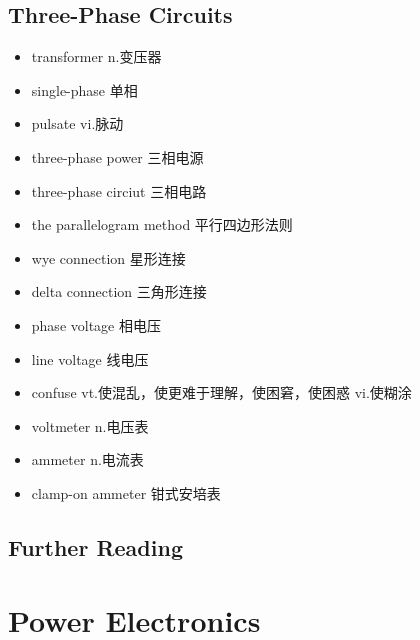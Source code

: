 \subsection{Three-Phase Circuits}
\begin{multicols}{2}
    \begin{itemize}
        \item transformer n.变压器
        \item single-phase 单相
        \item pulsate vi.脉动
        \item three-phase power 三相电源
        \item three-phase circiut 三相电路
        \item the parallelogram method 平行四边形法则
        \item wye connection 星形连接
        \item delta connection 三角形连接
        \item phase voltage 相电压
        \item line voltage 线电压
        \item confuse vt.使混乱，使更难于理解，使困窘，使困惑 vi.使糊涂
        \item voltmeter n.电压表
        \item ammeter n.电流表
        \item clamp-on ammeter 钳式安培表
    \end{itemize}
\end{multicols}

\subsection{Further Reading}

\section{Power Electronics}

